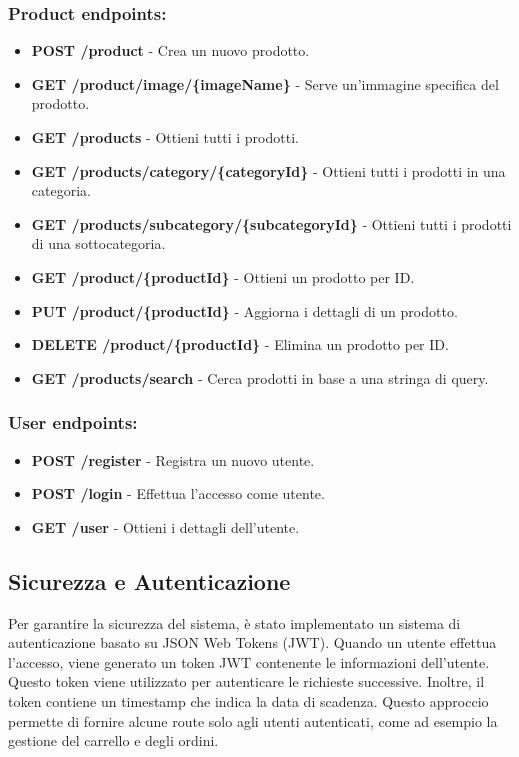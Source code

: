 \subsubsection{Product endpoints:}
\begin{itemize}
    \item \textbf{POST /product} - Crea un nuovo prodotto.
    \item \textbf{GET /product/image/\{imageName\}} - Serve un'immagine specifica del prodotto.
    \item \textbf{GET /products} - Ottieni tutti i prodotti.
    \item \textbf{GET /products/category/\{categoryId\}} - Ottieni tutti i prodotti in una categoria.
    \item \textbf{GET /products/subcategory/\{subcategoryId\}} - Ottieni tutti i prodotti di una sottocategoria.
    \item \textbf{GET /product/\{productId\}} - Ottieni un prodotto per ID.
    \item \textbf{PUT /product/\{productId\}} - Aggiorna i dettagli di un prodotto.
    \item \textbf{DELETE /product/\{productId\}} - Elimina un prodotto per ID.
    \item \textbf{GET /products/search} - Cerca prodotti in base a una stringa di query.
\end{itemize}

\subsubsection{User endpoints:}
\begin{itemize}
    \item \textbf{POST /register} - Registra un nuovo utente.
    \item \textbf{POST /login} - Effettua l'accesso come utente.
    \item \textbf{GET /user} - Ottieni i dettagli dell'utente.
\end{itemize}

\subsection{Sicurezza e Autenticazione}
Per garantire la sicurezza del sistema, è stato implementato un sistema di autenticazione basato su JSON Web Tokens (JWT).
Quando un utente effettua l'accesso, viene generato un token JWT contenente le informazioni dell'utente. Questo token viene utilizzato per autenticare le richieste successive. Inoltre, il token contiene un timestamp che indica la data di scadenza. Questo approccio permette di fornire alcune route solo agli utenti autenticati, come ad esempio la gestione del carrello e degli ordini.

